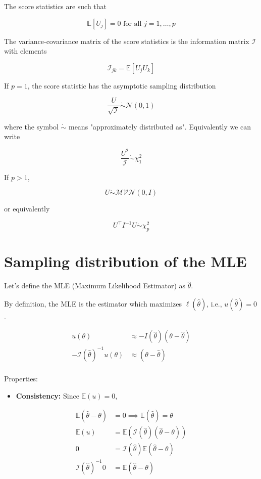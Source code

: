 \documentclass[11pt]{article}
\begin{document}
The score statistics are such that

\[\mathbb{E}[U_j] = 0 \text{ for all } j = 1, \ldots, p\]

The variance-covariance matrix of the score statistics is the information matrix \(\mathcal{I}\) with elements

\[\mathcal{I}_{jk} = \mathbb{E}[U_j U_k]\]

If \(p = 1\), the score statistic has the asymptotic sampling distribution

\[\frac{U}{\sqrt{\mathcal{I}}} \dot\sim \mathcal{N}(0, 1)\]

where the symbol \(\dot\sim\) means "approximately distributed as". Equivalently we can write

\[\frac{U^2}{\mathcal{I}} \dot\sim \chi^2_1\]

If \(p > 1\),

\[U \dot\sim \mathcal{MVN}(0, I)\]

or equivalently

\[U^\top I^{-1} U \dot\sim \chi^2_p\]

\section{Sampling distribution of the MLE}

Let's define the MLE (Maximum Likelihood Estimator) as \(\hat{\theta}\).

By definition, the MLE is the estimator which maximizes \(\ell(\hat{\theta})\), i.e., \(u(\hat{\theta}) = 0\).

\begin{align} \nonumber
    u(\theta) &\approx -I(\hat{\theta})(\theta - \hat{\theta}) \nonumber \\
    -\mathcal{I}(\hat{\theta})^{-1}u(\theta) &\approx (\theta - \hat{\theta}) \nonumber \\
\end{align} \nonumber

Properties:

\begin{itemize}
    \item \textbf{Consistency:} Since \( \mathbb{E}(u) = 0 \), \nonumber
\end{itemize}

\begin{align}
    \mathbb{E}(\hat{\theta} - \theta) &= 0 \implies \mathbb{E}(\hat{\theta}) = \theta \nonumber \\
    \mathbb{E}(u) &= \mathbb{E}(\mathcal{I}(\hat{\theta})(\hat{\theta} - \theta)) \nonumber \\
    0 &= \mathcal{I}(\hat{\theta}) \mathbb{E}(\hat{\theta} - \theta) \nonumber \\
    \mathcal{I}(\hat{\theta})^{-1}0 &= \mathbb{E}(\hat{\theta} - \theta) \nonumber \\
\end{align} \nonumber
\end{document}
